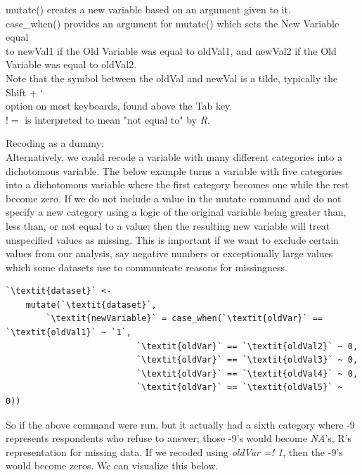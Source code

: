 \documentclass[12pt,letterpaper]{article}
\newcommand{\ind}{\phantom{AA}}
\begin{document}
\begin{tcolorbox}[title = Recoding Variables (cont.)]
mutate() creates a new variable based on an argument given to it.\\
case\_when() provides an argument for mutate() which sets the New Variable equal \\ \ind to newVal1 if the Old Variable was equal to oldVal1, and newVal2 if the Old \\ \ind Variable was equal to oldVal2.\\
Note that the symbol between the oldVal and newVal is a tilde, typically the Shift + ` \\ \ind option on most keyboards, found above the Tab key.\\
$!=$ is interpreted to mean "not equal to" by \textit{R}.\\
\vspace{.5em}

Recoding as a dummy:\\
\ind Alternatively, we could recode a variable with many different categories into a dichotomous variable. The below example turns a variable with five categories into a dichotomous variable where the first category becomes one while the rest become zero. If we do not include a value in the mutate command and do not specify a new category using a logic of the original variable being greater than, less than, or not equal to a value; then the resulting new variable will treat unspecified values as missing. This is important if we want to exclude certain values from our analysis, say negative numbers or exceptionally large values which some datasets use to communicate reasons for missingness.
\begin{lstlisting}
`\textit{dataset}` <-
    mutate(`\textit{dataset}`, 
        `\textit{newVariable}` = case_when(`\textit{oldVar}` == `\textit{oldVal1}` ~ `1`,
  	                      `\textit{oldVar}` == `\textit{oldVal2}` ~ 0,
  	                      `\textit{oldVar}` == `\textit{oldVal3}` ~ 0,
  	                      `\textit{oldVar}` == `\textit{oldVal4}` ~ 0,
  	                      `\textit{oldVar}` == `\textit{oldVal5}` ~ 0))
\end{lstlisting}
So if the above command were run, but it actually had a sixth category where -9 represents respondents who refuse to answer; those -9's would become \textit{NA}'s, R's representation for missing data. If we recoded using \textit{oldVar =! 1}, then the -9's would become zeros. We can visualize this below. \vspace{.5em} 


\end{tcolorbox}
\end{document}
